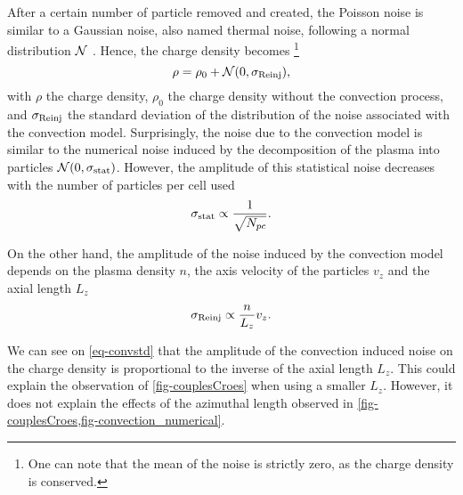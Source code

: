     After a certain number of particle removed and created, the Poisson noise is similar to a Gaussian noise, also named thermal noise, following a normal distribution $\mathcal{N}$ .
    Hence, the charge density becomes \footnote{One can note that the mean of the noise is strictly zero, as the charge density is conserved.}
    \begin{equation} \label{eq-rhonoise}
      \rho = \rho_0 + \mathcal{N}(0, \sigma_{\rm Reinj}),
    \end{equation}
    with $\rho$ the charge density, $\rho_0$ the charge density without the convection process, and $\sigma_{\rm Reinj}$ the standard deviation of the distribution of the noise associated with the convection model.
    Surprisingly, the noise due to the convection model is similar to the numerical noise induced by the decomposition of the plasma into particles $\mathcal{N}(0, \sigma_{\rm stat})$.
    However, the amplitude of this statistical noise decreases with the number of particles per cell used
    \begin{equation*} \label{eq-statistical}
     \sigma_{\rm stat} \propto \frac{1}{\sqrt{N_{pc}}}.
    \end{equation*}

    On the other hand, the amplitude of the noise induced by the convection model depends on the plasma density $n$, the axis velocity of the particles $v_z$ and the axial length $L_z$
    \begin{equation} \label{eq-convstd}
     \sigma_{\rm Reinj} \propto \frac{n}{L_z} v_z.
    \end{equation}

    We can see on \cref{eq-convstd} that the amplitude of the convection induced noise on the charge density is proportional to the inverse of the axial length $L_z$.
    This could explain the observation of \cref{fig-couplesCroes} when using a smaller $L_z$.
    However, it does not explain the effects of the azimuthal length observed in \cref{fig-couplesCroes,fig-convection_numerical}.

